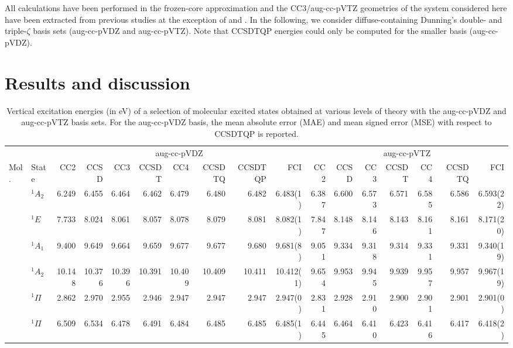 \documentclass[aip,jcp,reprint,noshowkeys,superscriptaddress]{revtex4-1}
\newcommand{\mc}{\multicolumn}
\begin{document}
All calculations have been performed in the frozen-core approximation and the CC3/aug-cc-pVTZ geometries of the system considered here have been extracted from previous studies at the exception of  and . \cite{Loos_2018a}
In the following, we consider diffuse-containing Dunning's double- and triple-$\zeta$ basis sets (aug-cc-pVDZ and aug-cc-pVTZ).
Note that CCSDTQP energies could only be computed for the smaller basis (aug-cc-pVDZ).

\section{Results and discussion}


\begin{squeezetable}
\begin{table}
	\caption{Vertical excitation energies (in eV) of a selection of molecular excited states obtained at various levels of theory with the aug-cc-pVDZ and aug-cc-pVTZ basis sets. 
	For the aug-cc-pVDZ basis, the mean absolute error (MAE) and mean signed error (MSE) with respect to CCSDTQP is reported.
	\label{tab:BigTab}}
	\begin{ruledtabular}
	\begin{tabular}{llrrrrrrrrrrrrrrr}
				&		&	\mc{8}{c}{aug-cc-pVDZ}		&		\mc{7}{c}{aug-cc-pVTZ}		\\	
				\cline{3-10} \cline{11-17}
	Mol.	&	State				&CC2	&CCSD	&CC3	&CCSDT	&CC4	&CCSDTQ	&CCSDTQP	&FCI	
									&CC2	&CCSD	&CC3	&CCSDT	&CC4	&CCSDTQ	&FCI			\\
	\hline
	\ce{NH3}	&	$^1A_2$ 		&6.249	&6.455	&6.464	&6.462	&6.479	&6.480	&6.482	&6.483(1)	&6.387	&6.600	&6.573	&6.571	&6.585	&6.586	&6.593(22)	\\	
				&	$^1E$			&7.733	&8.024	&8.061	&8.057	&8.078	&8.079	&8.081	&8.082(1)	&7.847	&8.148	&8.146	&8.143	&8.161	&8.161	&8.171(20)	\\	
				&	$^1A_1$ 		&9.400	&9.649	&9.664	&9.659	&9.677	&9.677	&9.680	&9.681(8)	&9.051	&9.334	&9.318	&9.314	&9.331	&9.331	&9.340(19)	\\
				&	$^1A_2$ 		&10.148	&10.376	&10.396	&10.391	&10.409	&10.409	&10.411	&10.412(1)	&9.654	&9.953	&9.945	&9.939	&9.957	&9.957	&9.967(19)	\\
	\ce{BH}		&	$^1\Pi$ 		&2.862	&2.970	&2.955	&2.946	&2.947	&2.947	&2.947	&2.947(0)	&2.831	&2.928	&2.910	&2.900	&2.901	&2.901	&2.901(0)	\\
	\ce{BF}		&	$^1\Pi$ 		&6.509	&6.534	&6.478	&6.491	&6.484	&6.485	&6.485	&6.485(1)	&6.445	&6.464	&6.410	&6.423	&6.416	&6.417	&6.418(2)\\

\end{tabular}
\end{ruledtabular}
\end{table}
\end{squeezetable}
\end{document}
